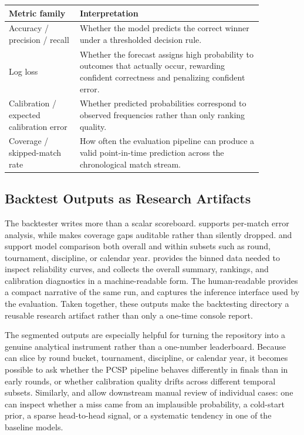 \documentclass{article}
\begin{document}
\begin{table}[H]
\centering
\small
\begin{tabular}{L{0.24\linewidth}L{0.62\linewidth}}
\toprule
Metric family & Interpretation \\
\midrule
Accuracy / precision / recall & Whether the model predicts the correct winner under a thresholded decision rule. \\
Log loss & Whether the forecast assigns high probability to outcomes that actually occur, rewarding confident correctness and penalizing confident error. \\
Calibration / expected calibration error & Whether predicted probabilities correspond to observed frequencies rather than only ranking quality. \\
Coverage / skipped-match rate & How often the evaluation pipeline can produce a valid point-in-time prediction across the chronological match stream. \\
\bottomrule
\end{tabular}
\end{table}

\subsection*{Backtest Outputs as Research Artifacts}
The backtester writes more than a scalar scoreboard.  supports per-match error analysis, while  makes coverage gaps auditable rather than silently dropped.  and  support model comparison both overall and within subsets such as round, tournament, discipline, or calendar year.  provides the binned data needed to inspect reliability curves, and  collects the overall summary, rankings, and calibration diagnostics in a machine-readable form. The human-readable  provides a compact narrative of the same run, and  captures the inference interface used by the evaluation. Taken together, these outputs make the backtesting directory a reusable research artifact rather than only a one-time console report.

The segmented outputs are especially helpful for turning the repository into a genuine analytical instrument rather than a one-number leaderboard. Because  can slice by round bucket, tournament, discipline, or calendar year, it becomes possible to ask whether the PCSP pipeline behaves differently in finals than in early rounds, or whether calibration quality drifts across different temporal subsets. Similarly,  and  allow downstream manual review of individual cases: one can inspect whether a miss came from an implausible probability, a cold-start prior, a sparse head-to-head signal, or a systematic tendency in one of the baseline models.
\end{document}
